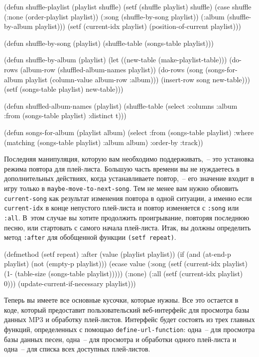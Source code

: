 \begin{myverb}
(defun shuffle-playlist (playlist shuffle)
  (setf (shuffle playlist) shuffle)
  (case shuffle
    (:none (order-playlist playlist))
    (:song (shuffle-by-song playlist))
    (:album (shuffle-by-album playlist)))
  (setf (current-idx playlist) (position-of-current playlist)))

(defun shuffle-by-song (playlist)
  (shuffle-table (songs-table playlist)))

(defun shuffle-by-album (playlist)
  (let ((new-table (make-playlist-table)))
    (do-rows (album-row (shuffled-album-names playlist))
      (do-rows (song (songs-for-album playlist (column-value album-row :album)))
        (insert-row song new-table)))
    (setf (songs-table playlist) new-table)))

(defun shuffled-album-names (playlist)
  (shuffle-table 
   (select
    :columns :album
    :from (songs-table playlist)
    :distinct t)))

(defun songs-for-album (playlist album)
  (select
   :from (songs-table playlist) 
   :where (matching (songs-table playlist) :album album)
   :order-by :track))
\end{myverb}

Последняя манипуляция, которую вам необходимо поддерживать,~-- это установка режима
повтора для плей-листа. Большую часть времени вы не нуждаетесь в дополнительных действиях,
когда устанавливаете повтор,~-- его значение входит в игру только в
\lstinline{maybe-move-to-next-song}.  Тем не менее вам нужно обновить
\lstinline{current-song} как результат изменения повтора в одной ситуации, а именно если
\lstinline{current-idx} в конце непустого плей-листа и повтор изменяется с
\lstinline{:song} или \lstinline{:all}. В~этом случае вы хотите продолжить проигрывание,
повторяя последнюю песню, или стартовать с самого начала плей-листа. Итак, вы должны
определить метод \lstinline{:after} для обобщенной функции \lstinline{(setf repeat)}.

\begin{myverb}
(defmethod (setf repeat) :after (value (playlist playlist))
  (if (and (at-end-p playlist) (not (empty-p playlist)))
    (ecase value
      (:song (setf (current-idx playlist) (1- (table-size (songs-table playlist)))))
      (:none)
      (:all  (setf (current-idx playlist) 0)))
    (update-current-if-necessary playlist)))
\end{myverb}

Теперь вы имеете все основные кусочки, которые нужны. Все это остается в коде, который
предоставит пользовательский веб-интерфейс для просмотра базы данных MP3 и обработку
плей-листов. Интерфейс будет состоять из трех главных функций, определенных с помощью
\lstinline{define-url-function}: одна~-- для просмотра базы данных песен, одна~-- для просмотра и
обработки одного плей-листа и одна~-- для списка всех доступных плей-листов.

